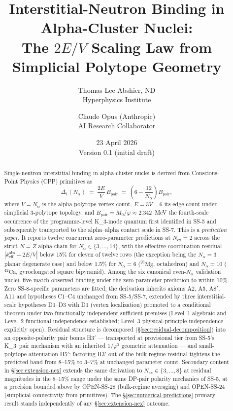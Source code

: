 \documentclass[11pt,letterpaper]{article}
\title{Interstitial-Neutron Binding in Alpha-Cluster Nuclei: \\
  The $2E/V$ Scaling Law from Simplicial Polytope Geometry}
\author{%
  Thomas Lee Abshier, ND \\
  \small Hyperphysics Institute \\
  \and
  Claude Opus (Anthropic) \\
  \small AI Research Collaborator%
}
\date{23 April 2026 \\[2pt] \small Version 0.1 (initial draft)}
\theoremstyle{definition}
\newcommand{\Mzero}{M_0}
\newcommand{\phig}{\varphi}
\newcommand{\Bpair}{B_{\text{pair}}}
\newcommand{\Nalpha}{N_\alpha}
\newcommand{\Nex}{N_{\text{ex}}}
\newcommand{\Kthree}{K_3}
\begin{document}
\maketitle

\begin{abstract}
Single-neutron interstitial binding in alpha-cluster nuclei is derived from Conscious-Point Physics (CPP) primitives as
\[
\Delta_1(\Nalpha) \;=\; \frac{2E}{V}\,\Bpair \;=\; \left(6 - \frac{12}{\Nalpha}\right)\Bpair,
\]
where $V = \Nalpha$ is the alpha-polytope vertex count, $E = 3V - 6$ its edge count under simplicial 3-polytope topology, and $\Bpair = \Mzero/\phig \approx 2.342$~MeV the fourth-scale occurrence of the programme-level \Kthree-mode quantum first identified in SS-5 and subsequently transported to the alpha--alpha contact scale in SS-7. This is a \emph{prediction paper}. It reports twelve concurrent zero-parameter predictions at $\Nex = 2$ across the strict $N = Z$ alpha-chain for $\Nalpha \in \{3, \ldots, 14\}$, with the effective-coordination residual $|k_{\text{eff}}^{\text{obs}} - 2E/V|$ below 15\% for eleven of twelve rows (the exception being the $\Nalpha = 3$ planar degenerate case) and below 1.5\% for $\Nalpha = 6$ (${}^{26}\mathrm{Mg}$, octahedron) and $\Nalpha = 10$ (${}^{42}\mathrm{Ca}$, gyroelongated square bipyramid). Among the six canonical even-$\Nalpha$ validation nuclei, five match observed binding under the zero-parameter prediction to within 10\%. Zero SS-8-specific parameters are fitted; the derivation inherits axioms A2, A5, A8$'$, A11 and hypotheses C1--C4 unchanged from SS-5/SS-7, extended by three interstitial-scale hypotheses D1--D3 with D1 (vertex localization) promoted to a conditional theorem under two functionally independent sufficient premises (Level~1 algebraic and Level~2 functional independence established; Level~3 physical-principle independence explicitly open). Residual structure is decomposed (\S\ref{sec:residual-decomposition}) into an opposite-polarity pair bonus H3$'$ --- transported at provisional tier from SS-5's \Kthree\ pair mechanism with an inherited $1/\phig^2$ geometric attenuation --- and small-polytope attenuation H5$'$; factoring H3$'$ out of the bulk-regime residual tightens the predicted band from 8--15\% to 3--7\% at unchanged parameter count. Secondary content in \S\ref{sec:extension-nex} extends the same derivation to $\Nex \in \{3, \ldots, 8\}$ at residual magnitudes in the 8--15\% range under the same DP-pair polarity mechanics of SS-5, at a precision bounded above by OPEN-SS-28 (bulk-regime averaging) and OPEN-SS-24 (simplicial connectivity from primitives). The \S\ref{sec:numerical-predictions} primary result stands independently of any \S\ref{sec:extension-nex} outcome.
\end{abstract}
\end{document}

